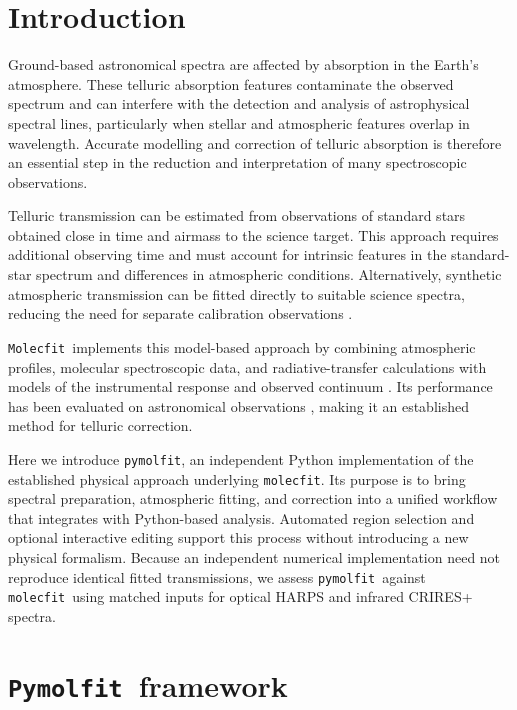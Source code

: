 \documentclass{aa}
\newcommand{\Molecfit}{{\texttt{Molecfit}}}
\newcommand{\molecfit}{{\texttt{molecfit}}}
\newcommand{\Pymolfit}{\texttt{Pymolfit}}
\newcommand{\pymolfit}{\texttt{pymolfit}}
\begin{document}
\section{Introduction}

Ground-based astronomical spectra are affected by absorption in the Earth's atmosphere. These telluric absorption features contaminate the observed spectrum and can interfere with the detection and analysis of astrophysical spectral lines, particularly when stellar and atmospheric features overlap in wavelength. Accurate modelling and correction of telluric absorption is therefore an essential step in the reduction and interpretation of many spectroscopic observations.

Telluric transmission can be estimated from observations of standard stars obtained close in time and airmass to the science target. This approach requires additional observing time and must account for intrinsic features in the standard-star spectrum and differences in atmospheric conditions. Alternatively, synthetic atmospheric transmission can be fitted directly to suitable science spectra, reducing the need for separate calibration observations \citep{MOLECFIT1}.

\Molecfit\ implements this model-based approach by combining atmospheric profiles, molecular spectroscopic data, and radiative-transfer calculations with models of the instrumental response and observed continuum \citep{MOLECFIT1}. Its performance has been evaluated on astronomical observations \citep{MOLECFIT2}, making it an established method for telluric correction.

Here we introduce \pymolfit, an independent Python implementation of the established physical approach underlying \molecfit. Its purpose is to bring spectral preparation, atmospheric fitting, and correction into a unified workflow that integrates with Python-based analysis. Automated region selection and optional interactive editing support this process without introducing a new physical formalism. Because an independent numerical implementation need not reproduce identical fitted transmissions, we assess \pymolfit\ against \molecfit\ using matched inputs for optical HARPS and infrared CRIRES+ spectra.


\section{\Pymolfit\ framework}
\end{document}
